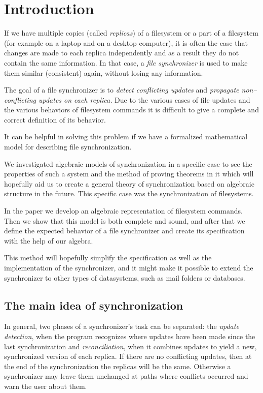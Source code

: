 \section{Introduction}

If we have multiple copies (called \emph{replicas}) of a filesystem or a
part of a filesystem (for example on a laptop and on a desktop
computer), it is often the case that changes are made to each
replica independently and as a result they do not contain the same
information. In that case, a \emph{file synchronizer} is used to make them
similar (consistent) again, without losing any information.

The goal of a file synchronizer is to \emph{detect conflicting updates}
and \emph{propagate non--conflicting updates on each replica.} Due to the
various cases of file updates and the various behaviors of filesystem
commands it is difficult to give a complete and correct definition of its
behavior.

It can be helpful in solving this problem if we have a
formalized mathematical model for describing file synchronization.

We investigated algebraic models of synchronization in a specific case to
see the properties of such a system and the method of proving theorems in
it which will hopefully aid us to create a general theory of
synchronization based on algebraic structure in the future. This specific
case was the synchronization of filesystems.

In the paper we develop an algebraic representation of filesystem
commands. Then we show that this model is both complete and sound,
and after that we define the expected behavior of a file synchronizer and
create its specification with the help of our algebra. 

This method will
hopefully simplify the specification as well as the implementation of the
synchronizer, and it might make it possible to extend the synchronizer to
other types of datasystems, such as mail folders or databases.

\subsection{The main idea of synchronization}

In general, two phases of a synchronizer's task can be separated: the
\emph{update detection}, when the program recognizes where updates have
been made since the last synchronization and \emph{reconciliation}, when
it combines updates to yield a new, synchronized version of each replica.
If there are no conflicting updates, then at the end of the
synchronization the replicas will be the same. Otherwise a synchronizer
may leave them unchanged at paths where conflicts occurred and warn the
user about them.


